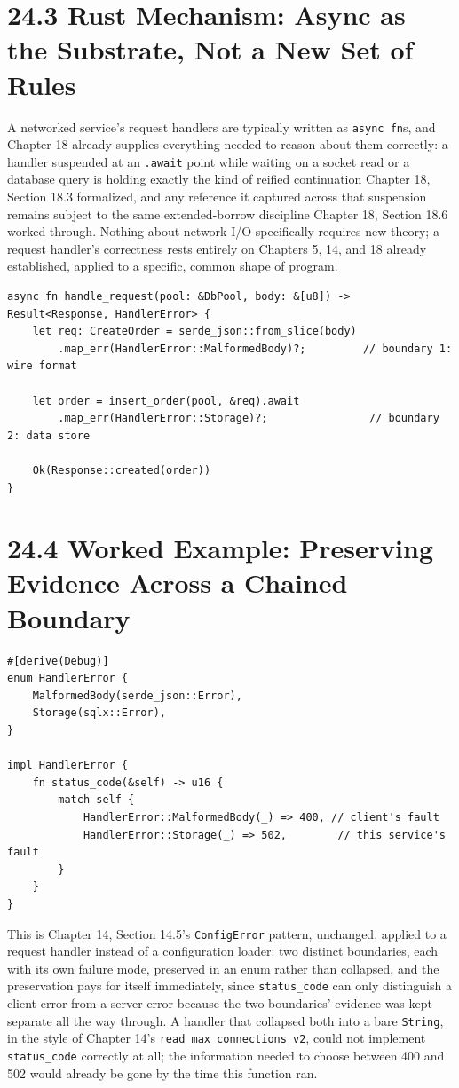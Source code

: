 \documentclass[11pt]{book}
\begin{document}
\section*{24.3 Rust Mechanism: Async as the Substrate, Not a New Set of Rules}

A networked service's request handlers are typically written as \texttt{async fn}s, and Chapter 18 already supplies everything needed to reason about them correctly: a handler suspended at an \texttt{.await} point while waiting on a socket read or a database query is holding exactly the kind of reified continuation Chapter 18, Section 18.3 formalized, and any reference it captured across that suspension remains subject to the same extended-borrow discipline Chapter 18, Section 18.6 worked through. Nothing about network I/O specifically requires new theory; a request handler's correctness rests entirely on Chapters 5, 14, and 18 already established, applied to a specific, common shape of program.

\begin{lstlisting}
async fn handle_request(pool: &DbPool, body: &[u8]) -> Result<Response, HandlerError> {
    let req: CreateOrder = serde_json::from_slice(body)
        .map_err(HandlerError::MalformedBody)?;         // boundary 1: wire format

    let order = insert_order(pool, &req).await
        .map_err(HandlerError::Storage)?;                // boundary 2: data store

    Ok(Response::created(order))
}
\end{lstlisting}

\section*{24.4 Worked Example: Preserving Evidence Across a Chained Boundary}

\begin{lstlisting}
#[derive(Debug)]
enum HandlerError {
    MalformedBody(serde_json::Error),
    Storage(sqlx::Error),
}

impl HandlerError {
    fn status_code(&self) -> u16 {
        match self {
            HandlerError::MalformedBody(_) => 400, // client's fault
            HandlerError::Storage(_) => 502,        // this service's fault
        }
    }
}
\end{lstlisting}

This is Chapter 14, Section 14.5's \texttt{ConfigError} pattern, unchanged, applied to a request handler instead of a configuration loader: two distinct boundaries, each with its own failure mode, preserved in an enum rather than collapsed, and the preservation pays for itself immediately, since \texttt{status\_code} can only distinguish a client error from a server error because the two boundaries' evidence was kept separate all the way through. A handler that collapsed both into a bare \texttt{String}, in the style of Chapter 14's \texttt{read\_max\_connections\_v2}, could not implement \texttt{status\_code} correctly at all; the information needed to choose between 400 and 502 would already be gone by the time this function ran.
\end{document}
